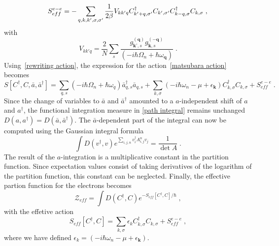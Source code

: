 \documentclass{article}
\begin{document}
\begin{equation}
    S^{e-e}_{eff} = -\sum_{q,k,k',\sigma,\sigma'} \frac{1}{2 \beta} V_{k k' q}
      C^{\dagger}_{k' + q,\sigma'}C_{k',\sigma'} C^{\dagger}_{k - q,\sigma}C_{k,\sigma}\;,\nonumber \\
    \label{effective hamiltonian}
\end{equation}
with
\begin{equation}
V_{k k' q} = \frac{2}{N} \sum_s \frac{g_{\textbf{k'},s}^{(\textbf{q})} g_{\textbf{k},s}^{(-\textbf{q})}  }{\left(-i\hbar\Omega_n + \hbar \omega_{\textbf{q}}\right)}\;.
\end{equation}
Using~\cref{rewriting action}, the expression for the action~\cref{matsubara action} becomes
\begin{equation}
     S[C^{\dagger},C,\bar{a},\bar{a}^{\dagger}] = \sum_{q,s} \left(-i\hbar\Omega_n + \hbar \omega_{q}\right)  \bar{a}^{\dagger}_{q,s}\bar{a}_{q,s} + \sum_{k,\sigma} \left(-i\hbar\omega_n - \mu + \epsilon_{\textbf{k}}\right) C^{\dagger}_{k,\sigma} C_{k,\sigma} +  S^{e-e}_{eff} \;.
     \label{action shifted coordinates}
\end{equation}
Since the change of variables to $\bar{a}$ and $\bar{a}^{\dagger}$ amounted to a $a$-independent shift of $a$ and $a^{\dagger}$, the functional integration measure in \cref{path integral} remains unchanged $D(a,a^{\dagger}) = D(\bar{a},\bar{a}^{\dagger})$. 
The $\bar{a}$-dependent part of the integral can now be computed using the Gaussian integral formula~\cite{Altland}
\begin{equation}
    \int D(v^{\dagger},v) e^{\sum_{i,j,n} v_i^{\dagger} A_{i,j}^{n} v_j} = \frac{1}{\det{A}} \;.
    \label{gaussian integral}
\end{equation}
The result of the ${a}$-integration is a multiplicative constant in the partition function. Since expectation values consist of taking derivatives of the logarithm of the partition function, this constant can be neglected. Finally, the effective partion function for the electrons becomes
\begin{equation}
    \mathcal{Z}_{eff} = \int D(C^{\dagger}, C) e^{-S_{eff}[C^{\dagger},C] / \hbar}\;,
    \label{effective partion function}
\end{equation} 
with the effetive action
\begin{equation}
    S_{eff}[C^{\dagger},C] = \sum_{k,\sigma} \epsilon_k C^{\dagger}_{k,\sigma} C_{k,\sigma} +  S^{e-e}_{eff} \;,
    \label{effective action}
\end{equation}
where we have defined $\epsilon_k = \left(-i\hbar\omega_n - \mu + \epsilon_{\textbf{k}}\right)$.
\end{document}
